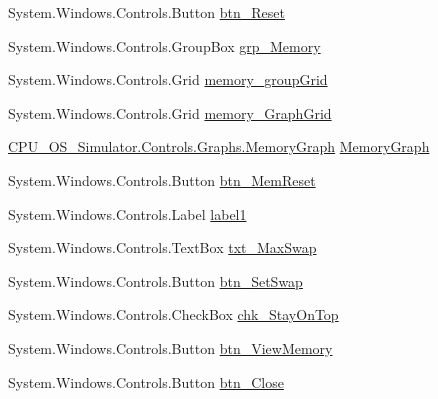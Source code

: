 \begin{DoxyCompactItemize}
\item 
System.\+Windows.\+Controls.\+Button \hyperlink{class_c_p_u___o_s___simulator_1_1_utilisation_window_a16d001bbb7b42530a56397f3339e3704}{btn\+\_\+\+Reset}
\item 
System.\+Windows.\+Controls.\+Group\+Box \hyperlink{class_c_p_u___o_s___simulator_1_1_utilisation_window_a8eb460220e13b601c32417a50f108590}{grp\+\_\+\+Memory}
\item 
System.\+Windows.\+Controls.\+Grid \hyperlink{class_c_p_u___o_s___simulator_1_1_utilisation_window_a4fb6d1f6970846264f1de50929230664}{memory\+\_\+group\+Grid}
\item 
System.\+Windows.\+Controls.\+Grid \hyperlink{class_c_p_u___o_s___simulator_1_1_utilisation_window_aa7e7647d26b40707fdbb58a182024cf2}{memory\+\_\+\+Graph\+Grid}
\item 
\hyperlink{class_c_p_u___o_s___simulator_1_1_controls_1_1_graphs_1_1_memory_graph}{C\+P\+U\+\_\+\+O\+S\+\_\+\+Simulator.\+Controls.\+Graphs.\+Memory\+Graph} \hyperlink{class_c_p_u___o_s___simulator_1_1_utilisation_window_aa26e672bc20df2926cc39de95dca5577}{Memory\+Graph}
\item 
System.\+Windows.\+Controls.\+Button \hyperlink{class_c_p_u___o_s___simulator_1_1_utilisation_window_adb923d9d563899c198d1dba63d5adb4b}{btn\+\_\+\+Mem\+Reset}
\item 
System.\+Windows.\+Controls.\+Label \hyperlink{class_c_p_u___o_s___simulator_1_1_utilisation_window_a72a3333fa298d3d899eb3380e4a54781}{label1}
\item 
System.\+Windows.\+Controls.\+Text\+Box \hyperlink{class_c_p_u___o_s___simulator_1_1_utilisation_window_a28206b9c624b718c2831c635e4169fe4}{txt\+\_\+\+Max\+Swap}
\item 
System.\+Windows.\+Controls.\+Button \hyperlink{class_c_p_u___o_s___simulator_1_1_utilisation_window_aa30361a85b16eec362b962731232111a}{btn\+\_\+\+Set\+Swap}
\item 
System.\+Windows.\+Controls.\+Check\+Box \hyperlink{class_c_p_u___o_s___simulator_1_1_utilisation_window_a57822ecc41163ffb04eba682746f0bfe}{chk\+\_\+\+Stay\+On\+Top}
\item 
System.\+Windows.\+Controls.\+Button \hyperlink{class_c_p_u___o_s___simulator_1_1_utilisation_window_ada6c7de17fffd9b2323bb932a8250197}{btn\+\_\+\+View\+Memory}
\item 
System.\+Windows.\+Controls.\+Button \hyperlink{class_c_p_u___o_s___simulator_1_1_utilisation_window_ad1de7147730f80ba77018de448417cb8}{btn\+\_\+\+Close}
\end{DoxyCompactItemize}
